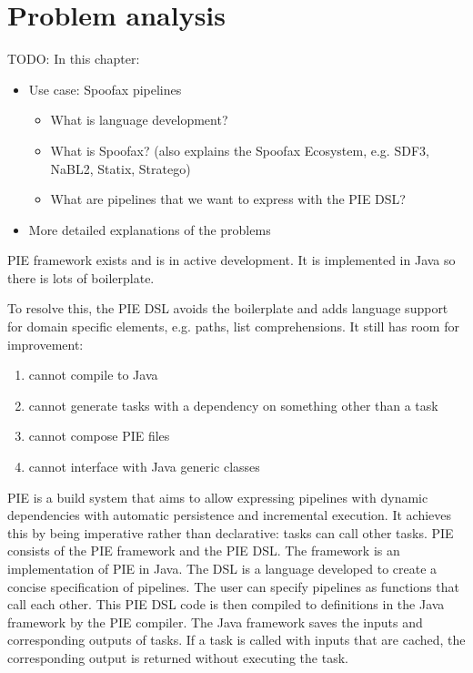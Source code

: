 
\chapter{\label{chap:problem_analysis}Problem analysis}

TODO: In this chapter:
\begin{itemize}
  \item Use case: Spoofax pipelines
  \begin{itemize}
    \item What is language development?
    \item What is Spoofax? (also explains the Spoofax Ecosystem, e.g. SDF3, NaBL2, Statix, Stratego)
    \item What are pipelines that we want to express with the PIE DSL?
  \end{itemize}
  \item More detailed explanations of the problems
\end{itemize}

PIE framework exists and is in active development.
It is implemented in Java so there is lots of boilerplate.

To resolve this, the PIE DSL avoids the boilerplate and adds language support for domain specific elements, e.g. paths, list comprehensions.
It still has room for improvement:
\begin{enumerate}
  \item cannot compile to Java
  \item cannot generate tasks with a dependency on something other than a task
  \item cannot compose PIE files
  \item cannot interface with Java generic classes
\end{enumerate}


\Ac{PIE} is a build system that aims to allow expressing pipelines with dynamic dependencies with automatic persistence and incremental execution.
It achieves this by being imperative rather than declarative: tasks can call other tasks.
\Ac{PIE} consists of the PIE framework and the \ac{PIE} \ac{DSL}.
The framework is an implementation of \ac{PIE} in Java.
The \ac{DSL} is a language developed to create a concise specification of pipelines.
The user can specify pipelines as functions that call each other.
This \ac{PIE} \ac{DSL} code is then compiled to definitions in the Java framework by the \ac{PIE} compiler.
The Java framework saves the inputs and corresponding outputs of tasks.
If a task is called with inputs that are cached, the corresponding output is returned without executing the task.


